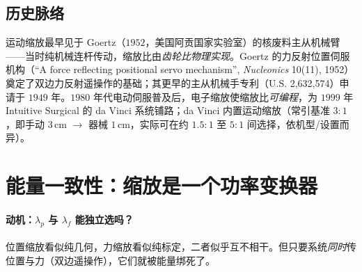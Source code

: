 \subsection{历史脉络}
\label{sec:tm-history}
运动缩放最早见于 Goertz（$1952$，美国阿贡国家实验室）的核废料主从机械臂——当时纯机械连杆传动，缩放比由\emph{齿轮比物理实现}。Goertz 的力反射位置伺服机构（“A force reflecting positional servo mechanism”, \emph{Nucleonics} 10(11), 1952）奠定了双边力反射遥操作的基础；其更早的主从机械手专利（U.S. 2,632,574）申请于 $1949$ 年。$1980$ 年代电动伺服普及后，电子缩放使缩放比\emph{可编程}，为 $1999$ 年 Intuitive Surgical 的 da Vinci 系统铺路；da Vinci 内置运动缩放（常引基准 $3{:}1$，即手动 $3\,$cm $\to$ 器械 $1\,$cm，实际可在约 $1.5{:}1$ 至 $5{:}1$ 间选择，依机型/设置而异）。

\section{能量一致性：缩放是一个功率变换器}
\label{sec:tm-energy}

\paragraph{动机：$\lambda_p$ 与 $\lambda_f$ 能独立选吗？}
位置缩放看似纯几何，力缩放看似纯标定，二者似乎互不相干。但只要系统\emph{同时}传位置与力（双边遥操作），它们就被能量绑死了。

